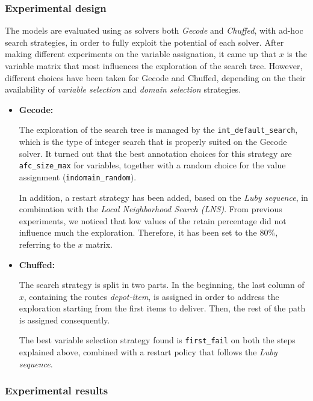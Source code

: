 \subsubsection{Experimental design}
The models are evaluated using as solvers both \textit{Gecode} and \textit{Chuffed}, with ad-hoc search strategies, in order to fully exploit the potential of each solver. After making different experiments on the variable assignation, it came up that $x$ is the variable matrix that most influences the exploration of the search tree. However, different choices have been taken for Gecode and Chuffed, depending on the their availability of \textit{variable selection} and \textit{domain selection} strategies.
\begin{itemize}
    \item \textbf{Gecode:}

        The exploration of the search tree is managed by the \texttt{int\_default\_search}, which is the type of integer search that is properly suited on the Gecode solver. It turned out that the best annotation choices for this strategy are \texttt{afc\_size\_max} for variables, together with a random choice for the value assignment (\texttt{indomain\_random}). 

        In addition, a restart strategy has been added, based on the \textit{Luby sequence}, in combination with the \textit{Local Neighborhood Search (LNS)}. From previous experiments, we noticed that low values of the retain percentage did not influence much the exploration. Therefore, it has been set to the $80\%$, referring to the $x$ matrix.

    \item \textbf{Chuffed:}

        The search strategy is split in two parts. In the beginning, the last column of $x$, containing the routes \textit{depot-item}, is assigned in order to address the exploration starting from the first items to deliver. Then, the rest of the path is assigned consequently.

        The best variable selection strategy found is \texttt{first\_fail} on both the steps explained above, combined with a restart policy that follows the \textit{Luby sequence}.
\end{itemize}

\subsubsection{Experimental results}

